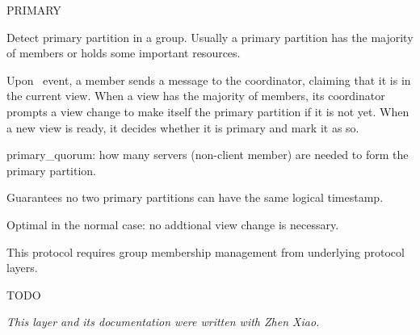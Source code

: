 \begin{Layer}{PRIMARY}

Detect primary partition in a group. Usually a primary partition has
the majority of members or holds some important resources.
\begin{Protocol}
Upon \UpInit\ event, a member sends a message to the coordinator,
claiming that it is in the current view. When a view has the majority
of members, its coordinator prompts a view change to make itself the
primary partition if it is not yet.  When a new view is ready, it
decides whether it is primary and mark it as so.
\end{Protocol}

\begin{Parameters}
\item primary\_quorum: how many servers (non-client member) are
needed to form the primary partition.
\end{Parameters}

\begin{Properties}
\item
Guarantees no two primary partitions can have the same logical timestamp.
\item
Optimal in the normal case: no addtional view change is necessary.
\item
This protocol requires group membership management from underlying
protocol layers. 
\end{Properties}

\begin{Sources}
\end{Sources}

\begin{GenEvent}
\genevent{\DnPrompt}
\genevent{\DnSend}
\end{GenEvent}

\begin{Testing}
\item
TODO
\end{Testing}

\emph{This layer and its documentation were written with Zhen Xiao.}
\end{Layer}
